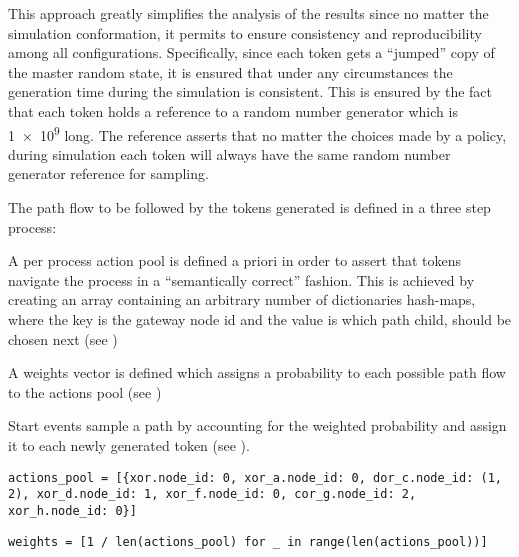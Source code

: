 This approach greatly simplifies the analysis of the results since no matter the simulation conformation, it permits to ensure consistency and reproducibility among all configurations. Specifically, since each token gets a ``jumped'' copy of the master random state, it is ensured that under any circumstances the generation time during the simulation is consistent. This is ensured by the fact that each token holds a reference to a random number generator which is \num{1e9} long. The reference asserts that no matter the choices made by a policy, during simulation each token will always have the same random number generator reference for sampling.

The path flow to be followed by the tokens generated is defined in a three step process:
\begin{enumerate*}
    \item A per process action pool is defined a priori in order to assert that tokens navigate the process in a ``semantically correct'' fashion. This is achieved by creating an array containing an arbitrary number of dictionaries \ie hash-maps, where the key is the gateway node id and the value is which path \ie child, should be chosen next (see )
    \item A weights vector is defined which assigns a probability to each possible path flow to the actions pool (see )
    \item Start events sample a path by accounting for the weighted probability and assign it to each newly generated token (see ).
\end{enumerate*}

\begin{lstlisting}[caption=Fixed actions pool consisting of different hashmaps each corresponding to a full path a token must follow during an instance. Keys correspond to node ids and values define which direction to take at gateways.,label=lst:actions_pool,style=CustomPython]
actions_pool = [{xor.node_id: 0, xor_a.node_id: 0, dor_c.node_id: (1, 2), xor_d.node_id: 1, xor_f.node_id: 0, cor_g.node_id: 2, xor_h.node_id: 0}]
\end{lstlisting}

\begin{lstlisting}[caption=Probability weights vector defining how often a path will be chosen. In this case equal probability is assigned to all paths in the action pool.,label=lst:probabilities_path_flow,style=CustomPython]
weights = [1 / len(actions_pool) for _ in range(len(actions_pool))]
\end{lstlisting}

